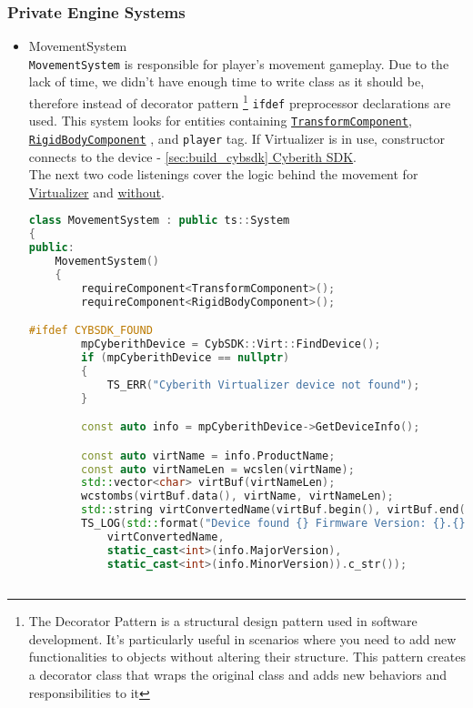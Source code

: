 \subsubsection{Private Engine Systems}
\begin{itemize}
    \item MovementSystem\\
    \label{movement_system}
    \texttt{MovementSystem} is responsible for player's movement gameplay. Due to the lack of time, we didn't have enough time to write class as it should be, therefore instead of decorator pattern \footnote{The Decorator Pattern is a structural design pattern used in software development. It's particularly useful in scenarios where you need to add new functionalities to objects without altering their structure. This pattern creates a decorator class that wraps the original class and adds new behaviors and responsibilities to it} \texttt{ifdef} preprocessor declarations are used.
    This system looks for entities containing \hyperref[transform_component]{\texttt{TransformComponent}}, \hyperref[rigidbody_component]{\texttt{RigidBodyComponent}} , and \texttt{player} tag. If Virtualizer is in use, constructor connects to the device - \hyperref[sec:build_cybsdk]{\ref*{sec:build_cybsdk} Cyberith SDK}.\\ The next two code listenings cover the logic behind the movement for \hyperref[cyb_movement]{Virtualizer} and \hyperref[noncyb_movement]{without}.
\begin{lstlisting}[language=c++, caption=Movement system (./engine/src/ecs/systems/movement\_system.hpp)]
class MovementSystem : public ts::System
{
public:
    MovementSystem()
    {
        requireComponent<TransformComponent>();
        requireComponent<RigidBodyComponent>();

#ifdef CYBSDK_FOUND
        mpCyberithDevice = CybSDK::Virt::FindDevice();
        if (mpCyberithDevice == nullptr)
        {
            TS_ERR("Cyberith Virtualizer device not found");
        }

        const auto info = mpCyberithDevice->GetDeviceInfo();

        const auto virtName = info.ProductName;
        const auto virtNameLen = wcslen(virtName);
        std::vector<char> virtBuf(virtNameLen);
        wcstombs(virtBuf.data(), virtName, virtNameLen);
        std::string virtConvertedName(virtBuf.begin(), virtBuf.end());
        TS_LOG(std::format("Device found {} Firmware Version: {}.{}",
            virtConvertedName,
            static_cast<int>(info.MajorVersion),
            static_cast<int>(info.MinorVersion)).c_str());



\end{lstlisting}
\end{itemize}
